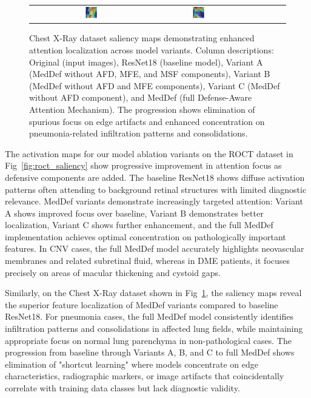 \documentclass[preprint,12pt]{elsarticle}
\begin{document}
\begin{figure}[!t]
\begin{tabular}{c c c c c c c}
          & \includegraphics[width=0.12\textwidth]{fig/saliency_map/chest_xray/no_afd2.png}
          & \includegraphics[width=0.12\textwidth]{fig/saliency_map/chest_xray/meddef12.png} \\
    \end{tabular}
    \caption{Chest X-Ray dataset saliency maps demonstrating enhanced attention localization across model variants. Column descriptions: Original (input images), ResNet18 (baseline model), Variant A (MedDef without AFD, MFE, and MSF components), Variant B (MedDef without AFD and MFE components), Variant C (MedDef without AFD component), and MedDef (full Defense-Aware Attention Mechanism). The progression shows elimination of spurious focus on edge artifacts and enhanced concentration on pneumonia-related infiltration patterns and consolidations.}
    \label{fig:chest_saliency}
\end{figure}

The activation maps for our model ablation variants on the ROCT dataset in Fig~\ref{fig:roct_saliency} show progressive improvement in attention focus as defensive components are added. The baseline ResNet18 shows diffuse activation patterns often attending to background retinal structures with limited diagnostic relevance. MedDef variants demonstrate increasingly targeted attention: Variant A shows improved focus over baseline, Variant B demonstrates better localization, Variant C shows further enhancement, and the full MedDef implementation achieves optimal concentration on pathologically important features. In CNV cases, the full MedDef model accurately highlights neovascular membranes and related subretinal fluid, whereas in DME patients, it focuses precisely on areas of macular thickening and cystoid gaps.

Similarly, on the Chest X-Ray dataset shown in Fig~\ref{fig:chest_saliency}, the saliency maps reveal the superior feature localization of MedDef variants compared to baseline ResNet18. For pneumonia cases, the full MedDef model consistently identifies infiltration patterns and consolidations in affected lung fields, while maintaining appropriate focus on normal lung parenchyma in non-pathological cases. The progression from baseline through Variants A, B, and C to full MedDef shows elimination of "shortcut learning" where models concentrate on edge characteristics, radiographic markers, or image artifacts that coincidentally correlate with training data classes but lack diagnostic validity.
\end{document}
